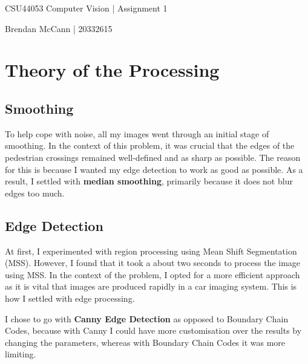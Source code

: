 \documentclass{article}  %
\begin{document}
	
	\begin{center}
		\begin{Large}
			CSU44053 Computer Vision | Assignment 1
			
			Brendan McCann | 20332615
		\end{Large}
	\end{center}
	
	\section{Theory of the Processing}
	
	\subsection{Smoothing}
	
	To help cope with noise, all my images went through an initial stage of smoothing. In the context of this problem, it was crucial that the edges of the pedestrian crossings remained well-defined and as sharp as possible. The reason for this is because I wanted my edge detection to work as good as possible. As a result, I settled with \textbf{median smoothing}, primarily because it does not blur edges too much.
	
	\subsection{Edge Detection}
	
	At first, I experimented with region processing using Mean Shift Segmentation (MSS). However, I found that it took a about two seconds to process the image using MSS. In the context of the problem, I opted for a more efficient approach as it is vital that images are produced rapidly in a car imaging system. This is how I settled with edge processing.
	
	I chose to go with \textbf{Canny Edge Detection} as opposed to Boundary Chain Codes, because with Canny I could have more customisation over the results by changing the parameters, whereas with Boundary Chain Codes it was more limiting.
	
\end{document}
